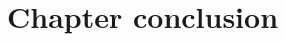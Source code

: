 \documentclass[a4paper,10pt,twoside]{book}
\begin{document}

% 
%
%
%
%
%
%
%


\section{Chapter conclusion}
\end{document}
